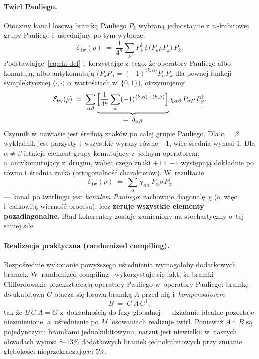 \documentclass[11pt,a4paper]{article}
\begin{document}
\paragraph{Twirl Pauliego.} Otoczmy kanał losową bramką Pauliego $P_k$ wybraną jednostajnie
z~$n$-kubitowej grupy Pauliego i~uśrednijmy po tym wyborze:
\begin{equation}
  \mathcal{E}_{\text{tw}}(\rho) \;=\; \frac{1}{4^n}\sum_k
  P_k^{\dagger}\,\mathcal{E}\bigl(P_k \rho P_k^{\dagger}\bigr)\,P_k .
\end{equation}
Podstawiając~\eqref{eq:chi-def} i~korzystając z~tego, że operatory Pauliego albo komutują, albo
antykomutują ($P_k P_\alpha = (-1)^{\langle k,\alpha\rangle} P_\alpha P_k$ dla pewnej funkcji
symplektycznej $\langle\cdot,\cdot\rangle$ o~wartościach w~$\{0,1\}$), otrzymujemy
\begin{equation}
  \mathcal{E}_{\text{tw}}(\rho) \;=\; \sum_{\alpha\beta}
  \underbrace{\Bigl[\frac{1}{4^n}\sum_k (-1)^{\langle k,\alpha\rangle + \langle k,\beta\rangle}\Bigr]}
  _{\textstyle =\;\delta_{\alpha\beta}}
  \chi_{\alpha\beta}\, P_\alpha \rho\, P_\beta^{\dagger} .
\end{equation}
Czynnik w~nawiasie jest średnią znaków po całej grupie Pauliego. Dla $\alpha=\beta$ wykładnik jest
parzysty i~wszystkie wyrazy równe $+1$, więc średnia wynosi 1. Dla $\alpha\neq\beta$ istnieje
element grupy komutujący z~jednym operatorem, a~antykomutujący z~drugim, wobec czego znaki
$+1$ i~$-1$ występują dokładnie po równo i~średnia znika (ortogonalność charakterów). W~rezultacie
\begin{equation}
  \boxed{\;\mathcal{E}_{\text{tw}}(\rho) \;=\; \sum_{\alpha} \chi_{\alpha\alpha}\,
  P_\alpha \rho\, P_\alpha^{\dagger}\;}
\end{equation}
--- kanał po twirlingu jest \emph{kanałem Pauliego}: zachowuje diagonalę $\chi$ (a~więc i~całkowitą
wierność procesu), lecz \textbf{zeruje wszystkie elementy pozadiagonalne}. Błąd koherentny zostaje
zamieniony na stochastyczny o~tej samej sile.

\paragraph{Realizacja praktyczna (randomized compiling).} Bezpośrednie wykonanie powyższego
uśrednienia wymagałoby dodatkowych bramek. W~randomized compiling~\cite{wallman2016,hashim2021}
wykorzystuje się fakt, że bramki Cliffordowskie przekształcają operatory Pauliego w~operatory
Pauliego: bramkę dwukubitową $G$ otacza się losową bramką $A$ przed nią i~\emph{kompensatorem}
\begin{equation}
  B \;=\; G\,A\,G^{\dagger},
\end{equation}
tak że $B\,G\,A = G$ z~dokładnością do fazy globalnej --- działanie idealne pozostaje niezmienione,
a~uśrednienie po $M$ losowaniach realizuje twirl. Ponieważ $A$ i~$B$ są pojedynczymi bramkami
jednokubitowymi, narzut jest niewielki: w~naszych obwodach wynosi $8$--$13\%$ dodatkowych bramek
jednokubitowych przy zmianie głębokości nieprzekraczającej $5\%$.

\end{document}
